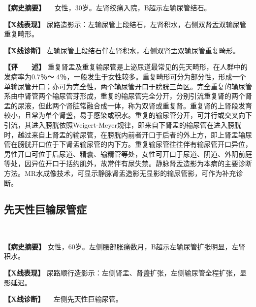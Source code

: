 \textbf{【病史摘要】} 　女性，30岁。左肾绞痛入院，B超示左输尿管结石。

\textbf{【X线表现】}
尿路造影示：左输尿管上段结石，左肾积水，右侧双肾盂双输尿管重复畸形。

\textbf{【X线诊断】}
左输尿管上段结石伴左肾积水，右侧双肾盂双输尿管重复畸形。

\textbf{【评　　述】}
重复肾盂及重复输尿管是上泌尿道最常见的先天畸形，在人群中的发病率为0.7％\textbf{～}
4％，一般发生于女性较多。重复畸形可分为部分性，形成一个单输尿管开口；亦可为完全性，两个输尿管开口于膀胱三角区。完全重复的输尿管系由中肾管两个输尿管芽形成，重复的输尿管完全分开，分别引流重复肾的两个肾盂的尿液，但此两个肾脏常融合成一体，称为双肾或重复肾。重复肾的上肾段发育较小，且常为单个肾盏，易于感染或积水。重复的输尿管分开，可并行或交叉向下引流，其进入膀胱依照Weigert-Meyer规律，即来自下肾盂的输尿管在进入膀胱时，越过来自上肾盂的输尿管，在膀胱内前者开口于后者的外上方，即上肾盂输尿管在膀胱开口位于下肾盂输尿管的内下方。重复输尿管往往伴有输尿管开口异位，男性开口可位于后尿道、精囊、输精管等处，女性可开口于尿道、阴道、外阴前庭等处，因异位开口于括约肌外，故常伴有尿失禁。静脉肾盂造影为本病的主要诊断方法。MR水成像技术，可显示静脉肾盂造影无显影的输尿管影，可作为补充诊断。

\subsection{先天性巨输尿管症}

\begin{figure}
    \centering
        \\
    \caption{}
    \label{fig6-2-8}
\end{figure}

\textbf{【病史摘要】}
女性，60岁。左侧腰部胀痛数月，B超示左输尿管扩张明显，左肾积水。

\textbf{【X线表现】}
尿路顺行造影示：左侧肾盂、肾盏扩张，左侧输尿管全程扩张，显影延迟。

\textbf{【X线诊断】} 　左侧先天性巨输尿管。

